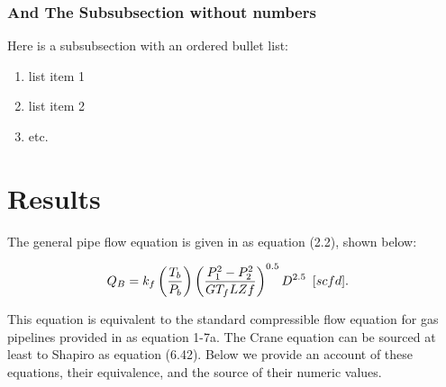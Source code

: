 \documentclass{psig_required_latex_files/psig}
\begin{document}
\subsubsection{And The Subsubsection without numbers}

Here is a subsubsection with an ordered bullet list:

\begin{enumerate}
\item list item 1
\item list item 2
\item etc.
\end{enumerate}




\section{Results}
The general pipe flow equation is given in \cite[Chapter 2]{GPH} as equation (2.2), shown below:
 
\begin{align}
Q_B  
&= k_f \left(\frac{T_b}{P_b} \right)\left(\frac{P_1^2 - P_2^2}{G T_f L Z f} \right)^{0.5}D^{2.5} \enskip [scfd].  \label{eq:pipe}
\end{align}


This equation is equivalent to the standard compressible flow equation for gas pipelines provided in \cite[Chapter 1]{crane1980flow} as equation 1-7a.  The Crane equation can be sourced at least to Shapiro \cite[Chapter 6]{shapiro1953dynamics} as equation (6.42).  Below we provide an account of these equations, their equivalence, and the source of their numeric values.
\end{document}
